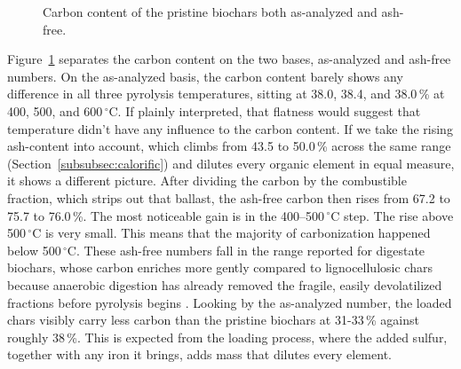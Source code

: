 \begin{figure}[ht]
\centering
{}
\caption{Carbon content of the pristine biochars both as-analyzed and ash-free.}
\label{fig:chns-carbon}
\end{figure}


Figure~\ref{fig:chns-carbon} separates the carbon content on the two bases, as-analyzed and ash-free numbers. On the as-analyzed basis, the carbon content barely shows any difference in all three pyrolysis temperatures, sitting at 38.0, 38.4, and 38.0\,\% at 400, 500, and 600\,$^{\circ}$C. If plainly interpreted, that flatness would suggest that temperature didn't have any influence to the carbon content. If we take the rising ash-content into account, which climbs from 43.5 to 50.0\,\% across the same range (Section~\ref{subsubsec:calorific}) and dilutes every organic element in equal measure, it shows a different picture. After dividing the carbon by the combustible fraction, which strips out that ballast, the ash-free carbon then rises from 67.2 to 75.7 to 76.0\,\%. The most noticeable gain is in the  400--500\,$^{\circ}$C step. The rise above 500\,$^{\circ}$C is very small. This means that the majority of carbonization happened below 500\,$^{\circ}$C. These ash-free numbers fall in the range reported for digestate biochars, whose carbon enriches more gently compared to lignocellulosic chars because anaerobic digestion has already removed the fragile, easily devolatilized fractions before pyrolysis begins \cite{kujawska-2026}. 
Looking by the as-analyzed number, the loaded chars visibly carry less carbon than the pristine biochars at 31-33\,\% against roughly 38\,\%. This is expected from the loading process, where the added sulfur, together with any iron it brings, adds mass that dilutes every element. 


